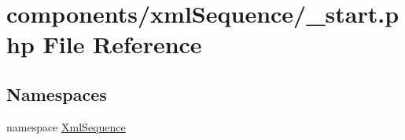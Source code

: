 \hypertarget{components_2xml_sequence_2__start_8php}{
\section{components/xmlSequence/\_\-start.php File Reference}
\label{components_2xml_sequence_2__start_8php}
}
\subsection*{Namespaces}
\begin{CompactItemize}
\item 
namespace \hyperlink{namespace_xml_sequence}{XmlSequence}
\end{CompactItemize}
